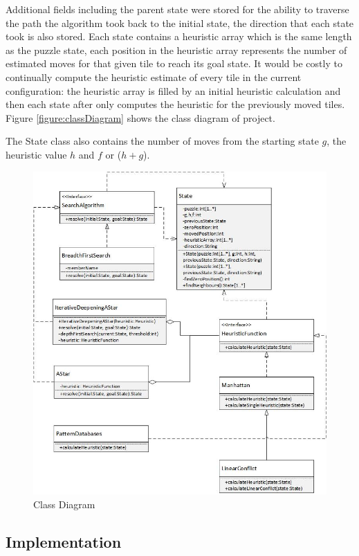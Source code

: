 \documentclass[final]{cmpreport}
\begin{document}
Additional fields including the parent state were stored for the ability to traverse the path the algorithm took back to the initial state, the direction that each state took is also stored. Each state contains a heuristic array which is the same length as the puzzle state, each position in the heuristic array represents the number of estimated moves for that given tile to reach its goal state. It would be costly to continually compute the heuristic estimate of every tile in the current configuration: the heuristic array is filled by an initial heuristic calculation and then each state after only computes the heuristic for the previously moved tiles. Figure \ref{figure:classDiagram} shows the class diagram of project.

The State class also contains the number of moves from the starting state $g$, the heuristic value $h$ and $f$ or ($h+g$).

\begin{figure}[h!]
	\centering
	\includegraphics[width=1.1\textwidth]{classDiagram}
	\captionsetup{justification=centering}
	\caption{Class Diagram}
\end{figure}

\subsection{Implementation}
\end{document}
